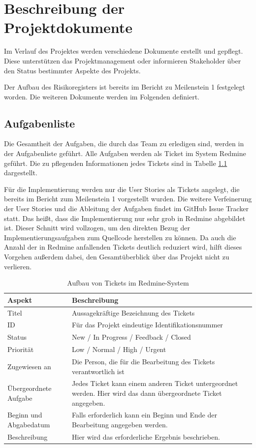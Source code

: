 \documentclass[a4paper,11pt,listof=numbered,glossary=totoc,parskip=half,toc=bib]{scrreprt}
\begin{document}
	
	\newpage
	\setcounter{tocdepth}{2}
	\tableofcontents
	
	\newpage
	\chapter{Beschreibung der Projektdokumente}

	Im Verlauf des Projektes werden verschiedene Dokumente erstellt und gepflegt. Diese unterstützen das Projektmanagement oder informieren Stakeholder über den Status bestimmter Aspekte des Projekts.
	
	Der Aufbau des Risikoregisters ist bereits im Bericht zu Meilenstein 1 festgelegt worden. Die weiteren Dokumente werden im Folgenden definiert.
	
	\section{Aufgabenliste}
	Die Gesamtheit der Aufgaben, die durch das Team zu erledigen sind, werden in der Aufgabenliste geführt. Alle Aufgaben werden als Ticket im System Redmine geführt. Die zu pflegenden Informationen jedes Tickets sind in Tabelle \ref{tab:tickets} dargestellt. 
	
	Für die Implementierung werden nur die User Stories als Tickets angelegt, die bereits im Bericht zum Meilenstein 1 vorgestellt wurden. Die weitere Verfeinerung der User Stories und die Ableitung der Aufgaben findet im GitHub Issue Tracker statt. Das heißt, dass die Implementierung nur sehr grob in Redmine abgebildet ist. Dieser Schnitt wird vollzogen, um den direkten Bezug der Implementierungsaufgaben zum Quellcode herstellen zu können. Da auch die Anzahl der in Redmine anfallenden Tickets deutlich reduziert wird, hilft dieses Vorgehen außerdem dabei, den Gesamtüberblick über das Projekt nicht zu verlieren.
	\begin{table}
		\centering
		\begin{tabularx}{\textwidth}{lX}
			\toprule
			\textbf{Aspekt} & \textbf{Beschreibung} \\
			\midrule
			Titel & Aussagekräftige Bezeichnung des Tickets \\
			ID & Für das Projekt eindeutige Identifikationsnummer \\
			Status & New / In Progress / Feedback / Closed \\
			Priorität & Low / Normal / High / Urgent \\
			Zugewiesen an & Die Person, die für die Bearbeitung des Tickets verantwortlich ist \\
			Übergeordnete Aufgabe & Jedes Ticket kann einem anderen Ticket untergeordnet werden. Hier wird das dann übergeordnete Ticket angegeben. \\
			Beginn und Abgabedatum & Falls erforderlich kann ein Beginn und Ende der Bearbeitung angegeben werden. \\
			Beschreibung & Hier wird das erforderliche Ergebnis beschrieben.\\
			\bottomrule
		\end{tabularx}
		\caption{Aufbau von Tickets im Redmine-System}
		\label{tab:tickets}
	\end{table}	
	
\end{document}
